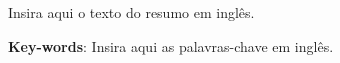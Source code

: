 \label{sec:abstract}

Insira aqui o texto do resumo em inglês.

\textbf{Key-words}: Insira aqui as palavras-chave em inglês.